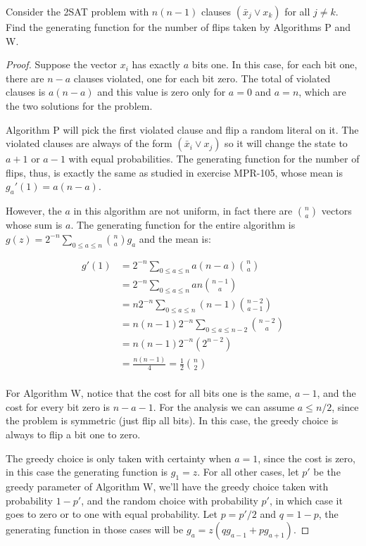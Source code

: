 \documentclass[10pt]{book}
\begin{document}
Consider the 2SAT problem with $n(n-1)$ clauses $(\bar{x}_j \vee x_k)$ for all $j\neq k$. Find the generating function for the number of flips taken by Algorithms P and W.

\begin{proof}

  Suppose the vector $x_i$ has exactly $a$ bits one. In this case, for each bit one, there are $n-a$ clauses violated, one for each bit zero. The total of violated clauses is $a(n-a)$ and this value is zero only for $a=0$ and $a=n$, which are the two solutions for the problem.

  Algorithm P will pick the first violated clause and flip a random literal on it. The violated clauses are always of the form $(\bar{x}_i \vee x_j)$ so it will change the state to $a+1$ or $a-1$ with equal probabilities. The generating function for the number of flips, thus, is exactly the same as studied in exercise MPR-105, whose mean is $g_a'(1)=a(n-a)$. 
  
  However, the $a$ in this algorithm are not uniform, in fact there are ${n \choose a}$ vectors whose sum is $a$. The generating function for the entire algorithm is $g(z)=2^{-n} \sum_{0\le a\le n}{n \choose a}g_a$ and the mean is:

  \begin{align*}
    g'(1) &= 2^{-n} \sum_{0\le a\le n} a(n-a){n \choose a} \\
       &= 2^{-n} \sum_{0\le a\le n} an{n-1 \choose a} \\
       &= n2^{-n} \sum_{0\le a\le n} (n-1){n-2 \choose a-1} \\
       &= n(n-1)2^{-n} \sum_{0\le a\le n-2} {n-2 \choose a} \\
       &= n(n-1)2^{-n} (2^{n-2}) \\
       &= \frac{n(n-1)}{4} = \frac{1}{2}{n\choose 2} \\
  \end{align*}

  For Algorithm W, notice that the cost for all bits one is the same, $a-1$, and the cost for every bit zero is $n-a-1$. For the analysis we can assume $a\le n/2$, since the problem is symmetric (just flip all bits). In this case, the greedy choice is always to flip a bit one to zero.

  The greedy choice is only taken with certainty when $a=1$, since the cost is zero, in this case the generating function is $g_1=z$. For all other cases, let $p'$ be the greedy parameter of Algorithm W, we'll have the greedy choice taken with probability $1-p'$, and the random choice with probability $p'$, in which case it goes to zero or to one with equal probability. Let $p=p'/2$ and $q=1-p$, the generating function in those cases will be $g_a=z(q g_{a-1}+p g_{a+1})$.


\end{proof}
\end{document}
